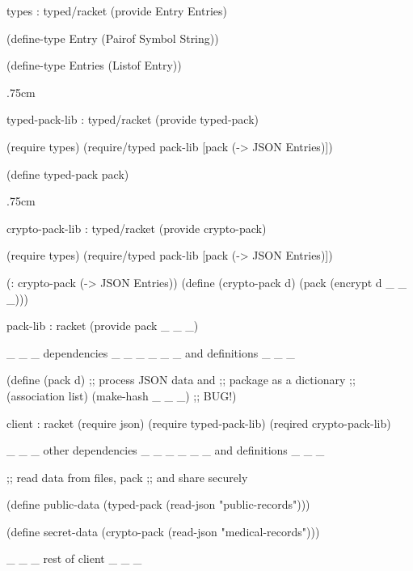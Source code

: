 \def\spacrr{.75cm}
\begin{figure*}[bh] \footnotesize

\begin{minipage}[b]{6.1cm}
\begin{module}{types : typed/racket}\typecolor
(provide Entry Entries)

(define-type Entry
  (Pairof Symbol String))

(define-type Entries
  (Listof Entry))
\end{module}

\vspace\spacrr

\begin{module}{typed-pack-lib : typed/racket}\typecolor
(provide typed-pack)

(require types)
(require/typed pack-lib
  [pack (-> JSON Entries)])

(define typed-pack pack) 
\end{module}

\vspace\spacrr

\begin{module}{crypto-pack-lib : typed/racket}\typecolor
(provide crypto-pack) 

(require types)
(require/typed pack-lib
 [pack (-> JSON Entries)])

(: crypto-pack (-> JSON Entries))
(define (crypto-pack d)
  (pack (encrypt d _ _ _)))
\end{module}\end{minipage}\hfil\begin{minipage}[b]{6.1cm}
\begin{module}{pack-lib : racket}\dyncolor
(provide pack _ _ _)

_ _ _  dependencies     _ _ _
_ _ _  and definitions  _ _ _

(define (pack d)
  ;; process JSON data and 
  ;; package as a dictionary
  ;; (association list)
  (make-hash _ _ _) ;; BUG!)
\end{module}
\begin{module}{client : racket}\dyncolor
(require json)
(require typed-pack-lib)
(reqired crypto-pack-lib)

_ _ _ other dependencies _ _ _
_ _ _ and definitions    _ _ _
          
;; read data from files, pack 
;; and share securely 

(define public-data 
  (typed-pack 
   (read-json 
    "public-records")))

(define secret-data 
  (crypto-pack 
   (read-json 
    "medical-records")))
 
 _ _ _ rest of client _ _ _
\end{module}
\end{minipage}


\caption{One mixed-typed program, three interpretations} \label{fig:example}
\end{figure*}
